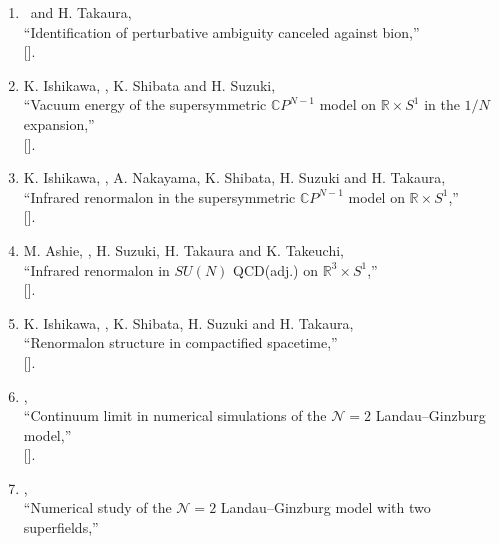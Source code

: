 \begin{enumerate}
       [].
 \item \OM\ and H. Takaura,\\
       ``Identification of perturbative ambiguity canceled against bion,''\\
       [].
 \item K. Ishikawa, \OM, K. Shibata and H. Suzuki,\\
       ``Vacuum energy of the supersymmetric $\mathbb{C}P^{N-1}$ model on $\mathbb{R}\times S^1$ in the $1/N$ expansion,''\\
       [].
 \item K. Ishikawa, \OM, A. Nakayama, K. Shibata, H. Suzuki and H. Takaura,\\
       ``Infrared renormalon in the supersymmetric $\mathbb{C}P^{N-1}$ model on $\mathbb{R}\times S^1$,''\\
       [].
 \item M. Ashie, \OM, H. Suzuki, H. Takaura and K. Takeuchi,\\
       ``Infrared renormalon in $SU(N)$ QCD(adj.) on $\mathbb{R}^3\times S^1$,''\\
       [].
 \item K. Ishikawa, \OM, K. Shibata, H. Suzuki and H. Takaura,\\
       ``Renormalon structure in compactified spacetime,''\\
       [].
 \item \OM,\\
       ``Continuum limit in numerical simulations of the $\mathcal{N}=2$ Landau--Ginzburg model,''\\
       [].
 \item \OM,\\
       ``Numerical study of the $\mathcal{N}=2$ Landau--Ginzburg model with two superfields,''\\

\end{enumerate}
